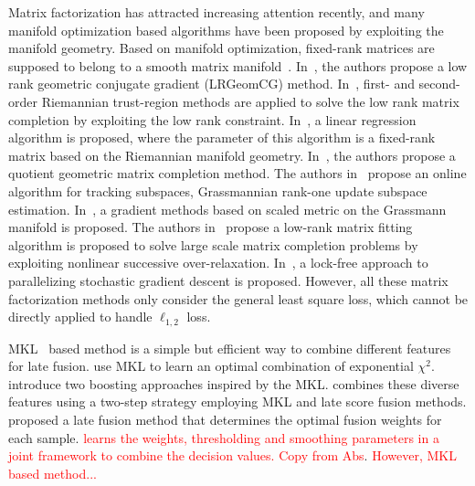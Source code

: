 \documentclass[letterpaper]{article}
\def\yanred{\textcolor{red}}
\begin{document}
Matrix factorization has attracted increasing attention recently,
and many manifold optimization based algorithms have been proposed by exploiting the manifold geometry.
Based on manifold optimization, fixed-rank matrices are supposed to belong to a smooth matrix manifold~\cite{Absil2008OAMM,vandereycken2013lowrank}.
In~\cite{vandereycken2013lowrank}, the authors propose a low rank geometric conjugate gradient (LRGeomCG) method.
In~\cite{rtrmc2011boumal}, first- and second-order Riemannian trust-region methods are applied to solve the low rank matrix completion by exploiting the low rank constraint.
In~\cite{Bonnabel2011}, a linear regression algorithm is proposed, where the parameter of this algorithm is a fixed-rank matrix based on the Riemannian manifold geometry.
In~\cite{Mishra2012}, the authors propose a quotient geometric matrix completion method.
The authors in~\cite{grouse2010Balzano} propose an online algorithm for tracking subspaces, Grassmannian rank-one update subspace estimation.
In~\cite{ngonips2012scaled}, a gradient methods based on scaled metric on the Grassmann manifold is proposed.
The authors in~\cite{Wen2012} propose a low-rank matrix fitting algorithm is proposed to solve large scale matrix completion problems by exploiting nonlinear successive over-relaxation.
In~\cite{RechtNIPS2011hogwild}, a lock-free approach to parallelizing stochastic gradient descent is proposed.
However, all these matrix factorization methods only consider the general least square loss, which cannot be directly applied to handle $\ell_{1,2}$ loss.




MKL~\cite{Rakotomamonjy2008Simplemkl} based method is a simple but efficient way to combine different features for late fusion. \cite{vedaldi2009multiple} use MKL to learn an optimal combination of exponential ${\chi}^2$. \cite{gehler2009feature} introduce two boosting approaches inspired by the MKL. \cite{natarajan2012multimodal} combines these diverse features using a two-step strategy employing MKL and late score fusion methods. \cite{lai2015learning} proposed a late fusion method that determines the optimal fusion weights for each sample. \yanred{\cite{xuiccv2013feature} learns the weights, thresholding and smoothing parameters in a joint framework to combine the decision values. Copy from Abs}. \yanred{However, MKL based method...}
\end{document}
